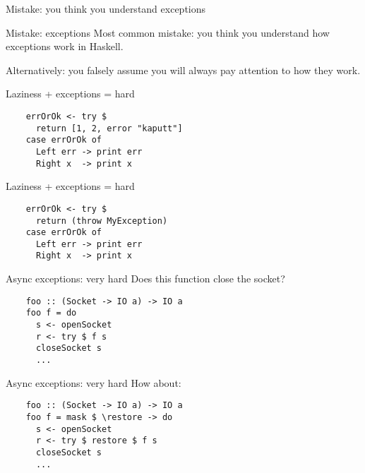 \documentclass[20pt]{beamer}
\newcommand{\vspaced}{
    \vspace{5mm}
}
\newcommand{\chapterslide}[1]{
    {
        \begin{frame}[plain]
        \begin{center}
        \large{#1}
        \end{center}
        \end{frame}
    }
}
\begin{document}

\chapterslide{Mistake: you think you understand exceptions}

\begin{frame}{Mistake: exceptions}
    Most common mistake: you think you understand how exceptions work in
    Haskell. \\
    \vspaced
    \small{Alternatively: you falsely assume you will always pay attention
    to how they work.}
\end{frame}

\begin{frame}[fragile]{Laziness + exceptions = hard}
    \begin{lstlisting}
    errOrOk <- try $
      return [1, 2, error "kaputt"]
    case errOrOk of
      Left err -> print err
      Right x  -> print x
    \end{lstlisting}
\end{frame}

\begin{frame}[fragile]{Laziness + exceptions = hard}
    \begin{lstlisting}
    errOrOk <- try $
      return (throw MyException)
    case errOrOk of
      Left err -> print err
      Right x  -> print x
    \end{lstlisting}
\end{frame}

\begin{frame}[fragile]{Async exceptions: very hard}
    Does this function close the socket?
    \begin{lstlisting}
    foo :: (Socket -> IO a) -> IO a
    foo f = do
      s <- openSocket
      r <- try $ f s
      closeSocket s
      ...
    \end{lstlisting}
\end{frame}

\begin{frame}[fragile]{Async exceptions: very hard}
    How about:
    \begin{lstlisting}
    foo :: (Socket -> IO a) -> IO a
    foo f = mask $ \restore -> do
      s <- openSocket
      r <- try $ restore $ f s
      closeSocket s
      ...
    \end{lstlisting}
\end{frame}
\end{document}

